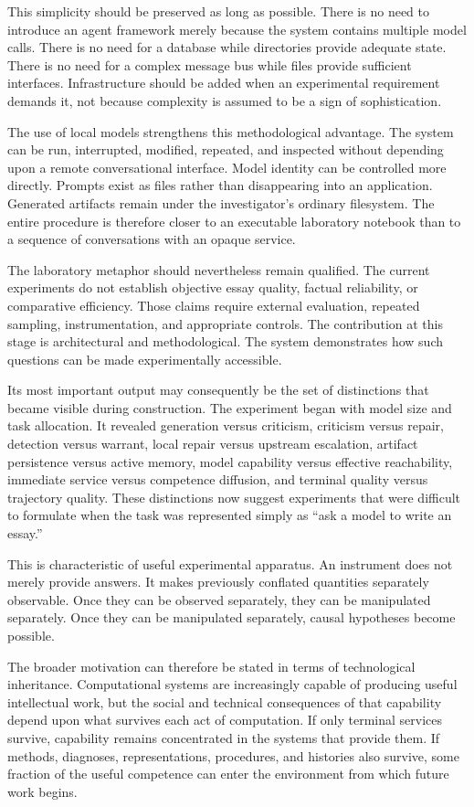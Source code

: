 \documentclass[11pt]{article}
\begin{document}
This simplicity should be preserved as long as possible. There is no need to introduce an agent framework merely because the system contains multiple model calls. There is no need for a database while directories provide adequate state. There is no need for a complex message bus while files provide sufficient interfaces. Infrastructure should be added when an experimental requirement demands it, not because complexity is assumed to be a sign of sophistication.

The use of local models strengthens this methodological advantage. The system can be run, interrupted, modified, repeated, and inspected without depending upon a remote conversational interface. Model identity can be controlled more directly. Prompts exist as files rather than disappearing into an application. Generated artifacts remain under the investigator's ordinary filesystem. The entire procedure is therefore closer to an executable laboratory notebook than to a sequence of conversations with an opaque service.

The laboratory metaphor should nevertheless remain qualified. The current experiments do not establish objective essay quality, factual reliability, or comparative efficiency. Those claims require external evaluation, repeated sampling, instrumentation, and appropriate controls. The contribution at this stage is architectural and methodological. The system demonstrates how such questions can be made experimentally accessible.

Its most important output may consequently be the set of distinctions that became visible during construction. The experiment began with model size and task allocation. It revealed generation versus criticism, criticism versus repair, detection versus warrant, local repair versus upstream escalation, artifact persistence versus active memory, model capability versus effective reachability, immediate service versus competence diffusion, and terminal quality versus trajectory quality. These distinctions now suggest experiments that were difficult to formulate when the task was represented simply as ``ask a model to write an essay.''

This is characteristic of useful experimental apparatus. An instrument does not merely provide answers. It makes previously conflated quantities separately observable. Once they can be observed separately, they can be manipulated separately. Once they can be manipulated separately, causal hypotheses become possible.

The broader motivation can therefore be stated in terms of technological inheritance. Computational systems are increasingly capable of producing useful intellectual work, but the social and technical consequences of that capability depend upon what survives each act of computation. If only terminal services survive, capability remains concentrated in the systems that provide them. If methods, diagnoses, representations, procedures, and histories also survive, some fraction of the useful competence can enter the environment from which future work begins.
\end{document}
